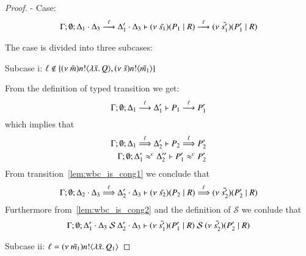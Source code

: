 \begin{proof}

	\noi - Case: 
	\[
		\horel{\Gamma}{\Delta_1 \cat \Delta_3}{\newsp{\tilde{s_1}}{P_1 \Par R}}{\by{\ell}}{\Delta_1' \cat \Delta_3}{\newsp{\tilde{s_1'}}{P_1' \Par R}}
	\]

	\noi The case is divided into three subcases:

	\noi Subcase i: $\ell \notin \set{\news{\tilde{m}} \bactout{n}{\abs{\tilde{x}}{Q}}, \news{\tilde{s}} \bactout{n}{\tilde{m_1}}}$

	\noi From the definition of typed transition we get:
	\[
		\horel{\Gamma}{\Delta_1}{P_1}{\by{\ell}}{\Delta_1'}{P_1'}
	\]
	\noi which implies that
%
	\begin{eqnarray}
		\horel{\Gamma}{\Delta_1}{P_2}{\By{\ell}}{\Delta_2'}{P_2'} \label{lem:wbc_is_cong1}\\
		\horel{\Gamma}{\Delta_1'}{P_1'}{\wbc}{\Delta_2''}{P_2'} \label{lem:wbc_is_cong2}
	\end{eqnarray}
%
	\noi From transition~\ref{lem:wbc_is_cong1} we conclude that 
	\[
		\horel{\Gamma}{\Delta_2 \cat \Delta_3}{\newsp{\tilde{s_2}}{P_2 \Par R}}{\By{\ell}}{\Delta_2' \cat \Delta_3}{\newsp{\tilde{s_2'}}{P_2' \Par R}}
	\]
%
	\noi Furthermore from~\ref{lem:wbc_is_cong2} and the definition of $\mathcal{S}$ we conlude that
	\[
		\horel{\Gamma}{\Delta_1' \cat \Delta_3}{\newsp{\tilde{s_1'}}{P_1' \Par R}}{\ \mathcal{S}\ }{\Delta_2' \cat \Delta_3}{\newsp{\tilde{s_2'}}{P_2' \Par R}}
	\]

	\noi Subcase ii: $\ell = \news{\tilde{m_1}} \bactout{n}{\abs{\tilde{x}}{Q_1}}$


\end{proof}
